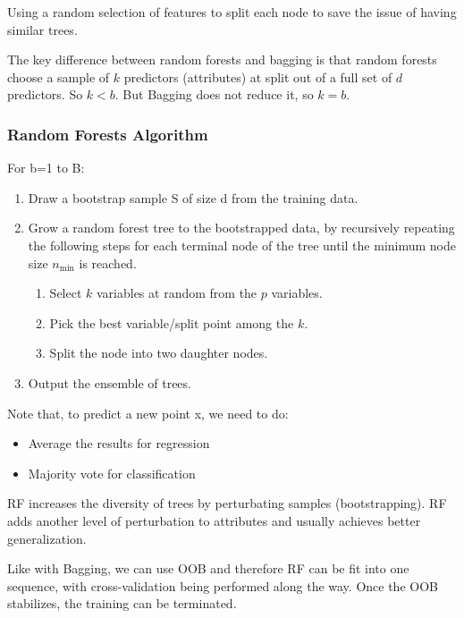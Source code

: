 \documentclass[letterpaper,12pt]{article}
\begin{document}
Using a random selection of features to split each node to save the issue of having similar trees.

The key difference between random forests and bagging is that random forests choose a sample of $k$ predictors (attributes) at split out of a full set of $d$ predictors. So $k<b$. But Bagging does not reduce it, so $k=b$.

\subsubsection{Random Forests Algorithm}
For b=1 to B:
\begin{enumerate}
    \item Draw a bootstrap sample S of size d from the training data. 
    \item Grow a random forest tree to the bootstrapped data, by recursively repeating the following steps for each terminal node of the tree until the minimum node size $n_{\min}$ is reached.
    \begin{enumerate}
        \item Select $k$ variables at random from the $p$ variables.
        \item Pick the best variable/split point among the $k$.
        \item Split the node into two daughter nodes.
    \end{enumerate}
    \item Output the ensemble of trees.
\end{enumerate}
 Note that, to predict a new point x, we need to do:
 \begin{itemize}
    \item Average the results for regression
    \item Majority vote for classification
 \end{itemize}

 RF increases the diversity of trees by perturbating samples (bootstrapping). RF adds another level of perturbation to attributes and usually achieves better generalization. 

 Like with Bagging, we can use OOB and therefore RF can be fit into one sequence, with cross-validation being performed along the way. Once the OOB stabilizes, the training can be terminated. 
\end{document}
